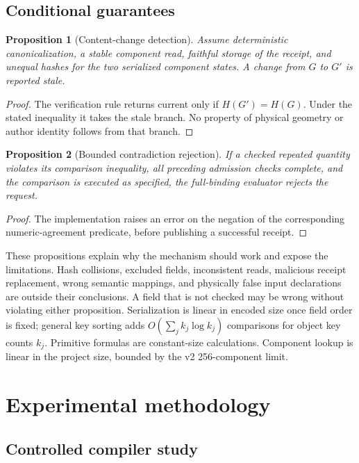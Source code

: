 \documentclass[10pt]{article}
\newtheorem{proposition}{Proposition}
\begin{document}
\subsection{Conditional guarantees}

\begin{proposition}[Content-change detection]
Assume deterministic canonicalization, a stable component read, faithful
storage of the receipt, and unequal hashes for the two serialized component
states. A change from \(G\) to \(G'\) is reported stale.
\end{proposition}
\begin{proof}
The verification rule returns current only if \(H(G')=H(G)\). Under the
stated inequality it takes the stale branch. No property of physical geometry
or author identity follows from that branch.
\end{proof}

\begin{proposition}[Bounded contradiction rejection]
If a checked repeated quantity violates its comparison inequality, all
preceding admission checks complete, and the comparison is executed as
specified, the full-binding evaluator rejects the request.
\end{proposition}
\begin{proof}
The implementation raises an error on the negation of the corresponding
numeric-agreement predicate, before publishing a successful receipt.
\end{proof}

These propositions explain why the mechanism should work and expose the
limitations. Hash collisions, excluded fields, inconsistent reads, malicious
receipt replacement, wrong semantic mappings, and physically false input
declarations are outside their conclusions. A field that is not checked may
be wrong without violating either proposition. Serialization is linear in
encoded size once field order is fixed; general key sorting adds
\(O(\sum_j k_j\log k_j)\) comparisons for object key counts \(k_j\).
Primitive formulas are constant-size calculations. Component lookup is linear
in the project size, bounded by the v2 256-component limit.

\section{Experimental methodology}

\subsection{Controlled compiler study}
\end{document}
